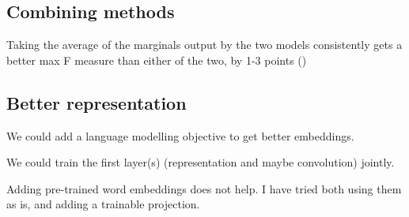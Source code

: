 \documentclass[10pt,a4paper]{article}
\begin{document}
\subsection{Combining methods}


Taking the average of the marginals output by the two models consistently gets a better max F measure than either of the two, by 1-3 points ()


\subsection{Better representation}

We could add a language modelling objective to get better embeddings.

We could train the first layer(s) (representation and maybe convolution) jointly.

Adding pre-trained word embeddings does not help. I have tried both using them as is, and adding a trainable projection.

\nocite{*}
{}

\end{document}
